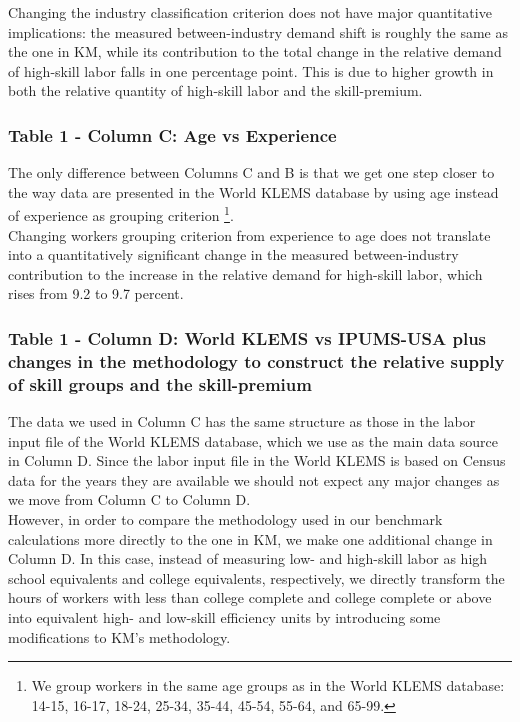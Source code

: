 \documentclass[10pt]{article}
\begin{document}
Changing the industry classification criterion does not have major quantitative implications: the measured between-industry demand shift is roughly the same as the one in KM, while its contribution to the total change in the relative demand of high-skill labor falls in one percentage point. This is due to higher growth in both the relative quantity of high-skill labor and the skill-premium.

\subsubsection*{Table 1 - Column C: Age vs Experience}
The only difference between Columns C and B is that we get one step closer to the way data are presented in the World KLEMS database by using age instead of experience as grouping criterion \footnote{We group workers in the same age groups as in the World KLEMS database: 14-15, 16-17, 18-24, 25-34, 35-44, 45-54, 55-64, and 65-99.}.\\

Changing workers grouping criterion from experience to age does not translate into a quantitatively significant change in the measured between-industry contribution to the increase in the relative demand for high-skill labor, which rises from 9.2 to 9.7 percent.

\subsubsection*{Table 1 - Column D: World KLEMS vs IPUMS-USA plus changes in the methodology to construct the relative supply of skill groups and the skill-premium}
The data we used in Column C has the same structure as those in the labor input file of the World KLEMS database, which we use as the main data source in Column D. Since the labor input file in the World KLEMS is based on Census data for the years they are available we should not expect any major changes as we move from Column C to Column D.\\

However, in order to compare the methodology used in our benchmark calculations more directly to the one in KM, we make one additional change in Column D. In this case, instead of measuring low- and high-skill labor as high school equivalents and college equivalents, respectively, we directly transform the hours of workers with less than college complete and college complete or above into equivalent high- and low-skill efficiency units by introducing some modifications to KM's methodology.\\
\end{document}
